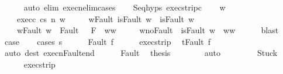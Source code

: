 \begin{isabellebody}
\ \ \ \ \isamarkupfalse%
\ {\isacharparenleft}auto\ elim{\isacharcolon}\ execn{\isacharunderscore}elim{\isacharunderscore}cases{\isacharparenright}\isanewline
\ \ \isamarkupfalse%
\ Seq{\isachardot}hyps\ exec{\isacharunderscore}strip{\isacharunderscore}c{}\isanewline
\ \ \isamarkupfalse%
\ w{\isacharprime}\ \ \isanewline
\ \ \ \ exec{\isacharunderscore}c{}{\isacharcolon}\ {\isachardoublequoteopen}{\isasymGamma}{\isasymturnstile}{\isasymlangle}c{}{\isacharcomma}s{\isasymrangle}\ {\isacharequal}n{\isasymRightarrow}\ w{\isacharprime}{\isachardoublequoteclose}\ \isanewline
\ \ \ \ w{\isacharunderscore}Fault{\isacharcolon}\ {\isachardoublequoteopen}isFault\ w\ {\isasymlongrightarrow}\ isFault\ w{\isacharprime}{\isachardoublequoteclose}\ \isanewline
\ \ \ \ w{\isacharprime}{\isacharunderscore}Fault{\isacharcolon}\ {\isachardoublequoteopen}w{\isacharprime}\ {\isasymin}\ Fault\ {\isacharbackquote}\ {\isacharparenleft}{\isacharminus}\ F{\isacharparenright}\ {\isasymlongrightarrow}\ w{\isacharprime}{\isacharequal}w{\isachardoublequoteclose}\ \isanewline
\ \ \ \ w{\isacharprime}{\isacharunderscore}noFault{\isacharcolon}\ {\isachardoublequoteopen}{\isasymnot}\ isFault\ w{\isacharprime}\ {\isasymlongrightarrow}\ w{\isacharprime}{\isacharequal}w{\isachardoublequoteclose}\isanewline
\ \ \ \ \isamarkupfalse%
\ blast\isanewline
\ \ \isamarkupfalse%
\ {\isacharquery}case\isanewline
\ \ \isamarkupfalse%
\ {\isacharparenleft}cases\ {\isachardoublequoteopen}s{\isachardoublequoteclose}{\isacharparenright}\isanewline
\ \ \ \ \isamarkupfalse%
\ {\isacharparenleft}Fault\ f{\isacharparenright}\isanewline
\ \ \ \ \isamarkupfalse%
\ exec{\isacharunderscore}strip\ \isamarkupfalse%
\ {\isachardoublequoteopen}t{\isacharequal}Fault\ f{\isachardoublequoteclose}\isanewline
\ \ \ \ \ \ \isamarkupfalse%
\ {\isacharparenleft}auto\ dest{\isacharcolon}\ execn{\isacharunderscore}Fault{\isacharunderscore}end{\isacharparenright}\isanewline
\ \ \ \ \isamarkupfalse%
\ Fault\ \isamarkupfalse%
\ {\isacharquery}thesis\isanewline
\ \ \ \ \ \ \isamarkupfalse%
\ auto\isanewline
\ \ \isamarkupfalse%
\isanewline
\ \ \ \ \isamarkupfalse%
\ Stuck\isanewline
\ \ \ \ \isamarkupfalse%
\ exec{\isacharunderscore}strip\ \isamarkupfalse%

\end{isabellebody}
